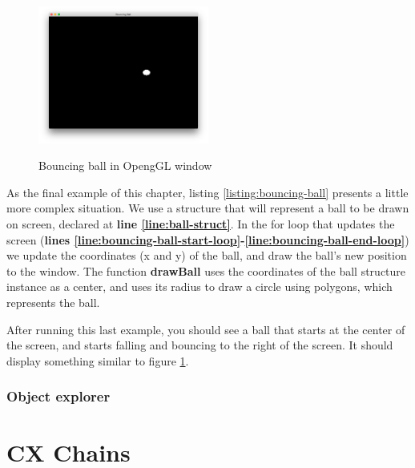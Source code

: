 \documentclass[11pt,fleqn,openany]{book} %
\begin{document}
\begin{figure}
\caption{Bouncing ball in OpengGL window}
\centering
\includegraphics[width=0.5\textwidth]{img/bouncing-ball.png}
\label{figure:bouncing-ball}
\end{figure}

As the final example of this chapter, listing \ref{listing:bouncing-ball} presents a little more complex situation. We use a structure that will represent a ball to be drawn on screen, declared at \textbf{line \ref{line:ball-struct}}. In the for loop that updates the screen (\textbf{lines \ref{line:bouncing-ball-start-loop}-\ref{line:bouncing-ball-end-loop}}) we update the coordinates (x and y) of the ball, and draw the ball's new position to the window. The function \textbf{drawBall} uses the coordinates of the ball structure instance as a center, and uses its radius to draw a circle using polygons, which represents the ball.

After running this last example, you should see a ball that starts at the center of the screen, and starts falling and bouncing to the right of the screen. It should display something similar to figure \ref{figure:bouncing-ball}.

\section{Object explorer}
\label{section:library-explorer}



\part{CX Chains}


\end{document}
